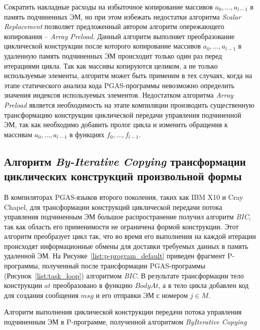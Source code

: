 Сократить накладные расходы на избыточное копирование массивов $a_{0},...,a_{l-1}$ в память подчиненных ЭМ, но при этом избежать недостатки алгоритма \textit{Scalar Replacement} позволяет предложенный автором алгоритм опережающего копирования -- \textit{Array Preload}. Данный алгоритм выполняет преобразование циклической конструкции после которого копирование массивов $a_{0},...,a_{l-1}$ в удаленную память подчиненных ЭМ происходит только один раз перед итерациями цикла. Так как массивы копируются целиком, а не только используемые элементы,
алгоритм может быть применим в тех случаях, когда на этапе статического анализа кода PGAS-программы невозможно определить значения индексов используемых элементов. Недостатком алгоритма \textit{Array Preload} является необходимость на этапе компиляции производить существенную трансформацию конструкции циклической передачи управления подчиненной ЭМ, так как необходимо добавить пролог цикла и изменить обращения к массивам $a_{0},...,a_{l-1}$ в функциях $f_{0},...,f_{l-1}$.

\subsection{Алгоритм \textit{By-Iterative Copying} трансформации циклических конструкций произвольной формы}

В компиляторах PGAS-языков второго поколения, таких как IBM X10 и Cray Chapel, для трансформации конструкций циклической передачи потока управления подчиненным ЭМ большое распространение получил алгоритм \textit{BIC}, так как область его применимости не ограничена формой конструкции. Этот алгоритм преобразует цикл так, что во время его выполнения на каждой итерации происходят информационные обмены для доставки требуемых данных в память удаленной ЭМ. На Рисунке~\ref{list:p-program_default} приведен фрагмент P-программы, полученный после трансформации PGAS-программы (Рисунок~\ref{list:task_loop}) алгоритмом \textit{BIC}. В результате трансформации тело конструкции $at$ преобразовано в функцию $BodyAt$, а в тело цикла добавлен код для создания сообщения $msg$ и его отправки ЭМ с номером $j \in M$.

\begin{algorithm}[!ht]
  
    \caption{Алгоритм выполнения циклической конструкции передачи потока управления подчиненным ЭМ в P-программе, полученной алгоритмом \textit{ByIterative Copying}}
    \label{list:p-program_default}
\end{algorithm}

